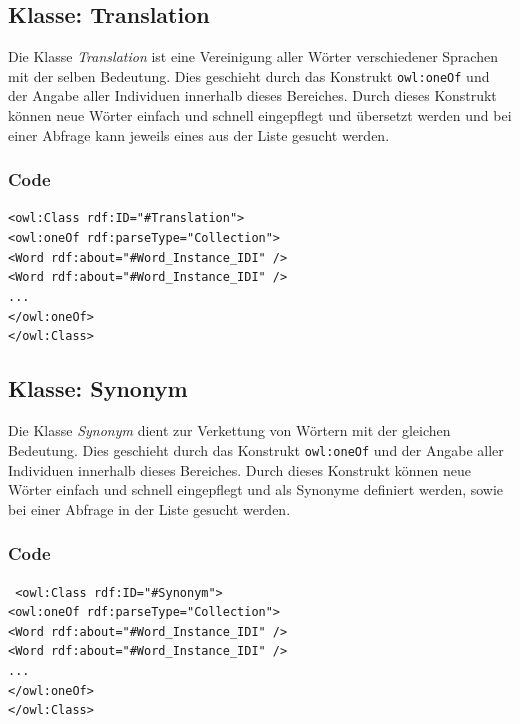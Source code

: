 ﻿\documentclass[
    11pt,
    latin1,
    a4paper,
    oneside
]{scrreprt}
\begin{document}
\subsection{Klasse: Translation} \label{sec:class_translation}

Die Klasse \emph{Translation} ist eine Vereinigung aller W\"orter verschiedener Sprachen mit der selben Bedeutung. Dies geschieht durch das Konstrukt \texttt{owl:oneOf} und der Angabe aller Individuen innerhalb dieses Bereiches. Durch dieses Konstrukt können neue Wörter einfach und schnell eingepflegt und \"ubersetzt werden und bei einer Abfrage kann jeweils eines aus der Liste gesucht werden.

\subsubsection{Code}  \label{sec:class_translation_code}

\texttt{<owl:Class rdf:ID="#Translation"> \\
	<owl:oneOf rdf:parseType="Collection"> \\
		<Word rdf:about="#Word_Instance_IDI" /> \\
		<Word rdf:about="#Word_Instance_IDI" /> \\
		... \\
	</owl:oneOf> \\
</owl:Class> }


\subsection{Klasse: Synonym} \label{sec:class_synonym}

Die Klasse \emph{Synonym} dient zur Verkettung von W\"ortern mit der gleichen Bedeutung. Dies geschieht durch das Konstrukt \texttt{owl:oneOf} und der Angabe aller Individuen innerhalb dieses Bereiches. Durch dieses Konstrukt können neue Wörter einfach und schnell eingepflegt und als Synonyme definiert werden, sowie bei einer Abfrage in der Liste gesucht werden.


\subsubsection{Code}  \label{sec:class_synonym_code}

\texttt{ <owl:Class rdf:ID="#Synonym"> \\
	<owl:oneOf rdf:parseType="Collection"> \\
		<Word rdf:about="#Word_Instance_IDI" /> \\
		<Word rdf:about="#Word_Instance_IDI" /> \\
		... \\
	</owl:oneOf> \\
</owl:Class> }
\end{document}
